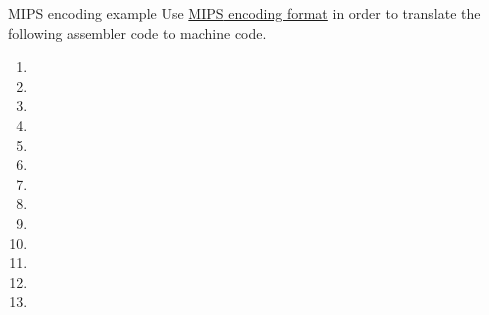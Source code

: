 \documentclass[]{slides}
\begin{document}
\newcommand{\coloropcode}[1]{\alertblue{#1}\xspace}
\newcommand{\colorrs}[1]{\alertdarkgreen{#1}\xspace}
\newcommand{\colorrt}[1]{\alertmagenta{#1}\xspace}
\newcommand{\colorrd}[1]{\alertviolet{#1}\xspace}
\newcommand{\colorsa}[1]{\alertcyan{#1}\xspace}
\newcommand{\colorfunc}[1]{\alertred{#1}\xspace}
\newcommand{\colorimmediate}[1]{\alertcyan{#1}\xspace}

\newcommand{\crt}{\colorrt{rt}}
\newcommand{\crs}{\colorrs{rs}}
\newcommand{\crd}{\colorrd{rd}}
\newcommand{\cimmediate}{\colorimmediate{immediate}}
\newcommand{\caddress}{\colorimmediate{address}}

% 
\begin{frame}{MIPS encoding example}
Use \textcolor{blue}{\href{http://www.mrc.uidaho.edu/mrc/people/jff/digital/MIPSir.html}{\ac{MIPS} encoding format}} in order to translate the following assembler code to machine code.
\begin{enumerate}
\item \mipsinstA
\item \mipsinstB
\item \mipsinstC
\item \mipsinstD
\item \mipsinstE
\item \mipsinstF
\item \mipsinstG
\item \mipsinstH
\item \mipsinstI
\item \mipsinstJ
\item \mipsinstK
\item \mipsinstL
\item \mipsinstM
\end{enumerate}
\end{frame}
\end{document}
